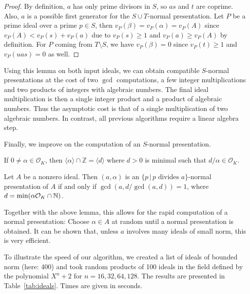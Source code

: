 \documentclass{sig-alternate-05-2015}
\begin{document}
\begin{proof}
By definition, $a$ has only prime divisors in $S$, so $as$ and $t$ are coprime.
Also, $a$ is a possible first generator for the $S\cup T$-normal presentation.
Let $P$ be a prime ideal over a prime $p\in S$, then
$v_P(\beta) = v_P(\alpha)= v_P(A)$ since $v_P(A) <v_P(s)+v_P(a)$ due to $v_P(s)\ge 1$ and $v_P(a) \ge v_P(A)$ by definition.
For $P$ coming from $T\setminus S$, we have $v_P(\beta) = 0$ since $v_P(t)\ge 1$ and $v_P(uas) = 0$ as well.
\end{proof}

Using this lemma on both input ideals, we can obtain compatible $S$-normal 
presentations at the cost of two $\gcd$ computations, a few integer multiplications and two products of integers with algebraic numbers. The final ideal
multiplication is then a single integer product and a product of
algebraic numbers. Thus the asymptotic cost is that of a single multiplication of two algebraic numbers.
In contrast, all previous algorithms require a linear algebra step.

Finally, we improve on the computation of an $S$-normal presentation.

\begin{lemma}
If $0\ne\alpha\in \mathcal O_K$, then $\langle\alpha\rangle\cap \mathbb Z = \langle d\rangle$ where $d>0$ is minimal such that $d/\alpha\in \mathcal O_K$.
\end{lemma}

\begin{theorem}
Let $A$ be a nonzero ideal. Then
$(a, \alpha)$ is an $\{p \, | \, p \text{ divides }a\}$-normal presentation of $A$ if and only if
$\gcd(a, {d}/{\gcd(a, d)}) = 1$, where $d = \min(\alpha\mathcal O_K \cap \mathbb{N})$.
\end{theorem}

Together with the above lemma, this allows for the rapid computation of a
normal presentation: Choose $\alpha\in A$ at random until a normal presentation
is obtained. It can be shown that, unless $a$ involves many ideals of small
norm, this is very efficient.

To illustrate the speed of our algorithm, we created a list of ideals of bounded norm (here: 400) and
took random products of 100 ideals in the field
defined by the polynomial $X^n + 2$ for $n=16, 32, 64, 128$.
The results are presented in Table~\ref{tab:ideals}.
Times are given in seconds.
\end{document}

